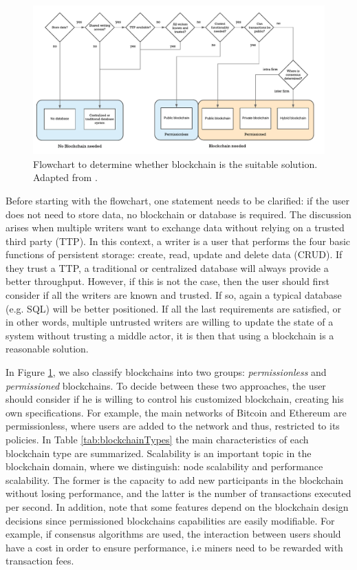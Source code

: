 \begin{figure}[bth]
	\centering
	\includegraphics[width=1\linewidth]{gfx/bcFlowchart}    
  	\caption{Flowchart to determine whether blockchain is the suitable solution. Adapted from \citep{wust2017you}.}
  	\label{fig:bcFlowchart}
\end{figure}

Before starting with the flowchart, one statement needs to be clarified: if the user does not need to store data, no blockchain or database is required. The discussion arises when multiple writers want to exchange data without relying on a trusted third party (TTP). In this context, a writer is a user that performs the four basic functions of persistent storage: create, read, update and delete data (CRUD). If they trust a TTP, a traditional or centralized database will always provide a better throughput. However, if this is not the case, then the user should first consider if all the writers are known and trusted. If so, again a typical database (e.g. SQL) will be better positioned. If all the last requirements are satisfied, or in other words, multiple untrusted writers are willing to update the state of a system without trusting a middle actor, it is then that using a blockchain is a reasonable solution.

In Figure \ref{fig:bcFlowchart}, we also classify blockchains into two groups: \textit{permissionless} and \textit{permissioned} blockchains. To decide between these two approaches, the user should consider if he is willing to control his customized blockchain, creating his own specifications. For example, the main networks of Bitcoin and Ethereum are permissionless, where users are added to the network and thus, restricted to its policies. In Table \ref{tab:blockchainTypes} the main characteristics of each blockchain type are summarized. Scalability is an important topic in the blockchain domain, where we distinguish: node scalability and performance scalability. The former is the capacity to add new participants in the blockchain without losing performance, and the latter is the number of transactions executed per second. In addition, note that some features depend on the blockchain design decisions since permissioned blockchains capabilities are easily modifiable. For example, if consensus algorithms are used, the interaction between users should have a cost in order to ensure performance, i.e miners need to be rewarded with transaction fees.

